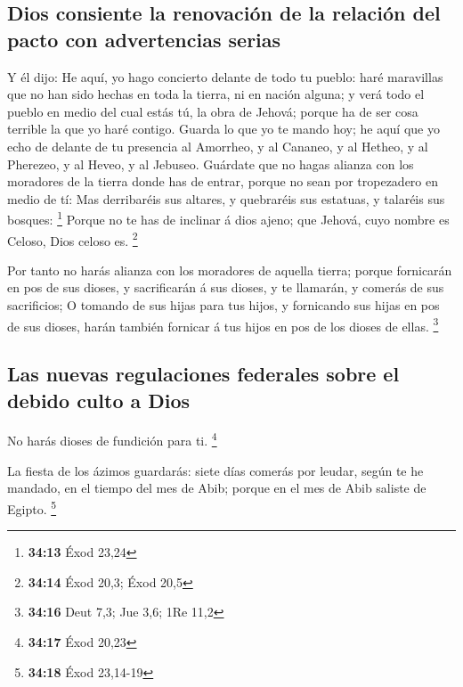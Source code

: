 \hypertarget{dios-consiente-la-renovaciuxf3n-de-la-relaciuxf3n-del-pacto-con-advertencias-serias}{%
\subsection{Dios consiente la renovación de la relación del pacto con
advertencias
serias}\label{dios-consiente-la-renovaciuxf3n-de-la-relaciuxf3n-del-pacto-con-advertencias-serias}}

 Y él dijo: He aquí, yo hago concierto delante de todo tu
pueblo: haré maravillas que no han sido hechas en toda la tierra, ni en
nación alguna; y verá todo el pueblo en medio del cual estás tú, la obra
de Jehová; porque ha de ser cosa terrible la que yo haré contigo.
 Guarda lo que yo te mando hoy; he aquí que yo echo de
delante de tu presencia al Amorrheo, y al Cananeo, y al Hetheo, y al
Pherezeo, y al Heveo, y al Jebuseo.  Guárdate que no
hagas alianza con los moradores de la tierra donde has de entrar, porque
no sean por tropezadero en medio de tí:  Mas derribaréis
sus altares, y quebraréis sus estatuas, y talaréis sus bosques:
\footnote{\textbf{34:13} Éxod 23,24}  Porque no te has de
inclinar á dios ajeno; que Jehová, cuyo nombre es Celoso, Dios celoso
es. \footnote{\textbf{34:14} Éxod 20,3; Éxod 20,5}

 Por tanto no harás alianza con los moradores de aquella
tierra; porque fornicarán en pos de sus dioses, y sacrificarán á sus
dioses, y te llamarán, y comerás de sus sacrificios;  O
tomando de sus hijas para tus hijos, y fornicando sus hijas en pos de
sus dioses, harán también fornicar á tus hijos en pos de los dioses de
ellas. \footnote{\textbf{34:16} Deut 7,3; Jue 3,6; 1Re 11,2}

\hypertarget{las-nuevas-regulaciones-federales-sobre-el-debido-culto-a-dios}{%
\subsection{Las nuevas regulaciones federales sobre el debido culto a
Dios}\label{las-nuevas-regulaciones-federales-sobre-el-debido-culto-a-dios}}

 No harás dioses de fundición para ti. \footnote{\textbf{34:17}
  Éxod 20,23}

 La fiesta de los ázimos guardarás: siete días comerás
por leudar, según te he mandado, en el tiempo del mes de Abib; porque en
el mes de Abib saliste de Egipto. \footnote{\textbf{34:18} Éxod 23,14-19}

